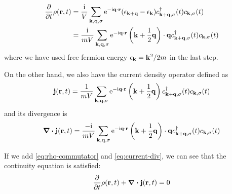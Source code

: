 \documentclass{article}
\newcommand{\ii}{\mathrm{i}}
\newcommand{\me}{\mathrm{e}}
\begin{document}
\begin{equation}\label{eq:rho-commutator}
    \begin{split}
        \pdv{t}\rho(\vb{r},t)&=\frac{\ii}{V}\sum_{\vb{k},\vb{q},\sigma}\me^{-\ii\vb{q}\cdot \vb{r}}(\epsilon_{\vb{k}+\vb{q}}-\epsilon_{\vb{k}})c_{\vb{k}+\vb{q},\sigma}^\dagger(t)c_{\vb{k},\sigma}(t)\\
                             &=\frac{\ii}{mV}\sum_{\vb{k},\vb{q},\sigma}\me^{-\ii\vb{q}\cdot \vb{r}}\left(\vb{k}+\frac{1}{2}\vb{q}\right)\cdot\vb{q}c_{\vb{k}+\vb{q},\sigma}^\dagger(t)c_{\vb{k},\sigma}(t)
    \end{split}
\end{equation}
where we have used free fermion energy $\epsilon_{\vb{k}}=\vb{k}^2/2m$ in the last step.

On the other hand, we also have the current density operator defined as
\begin{equation}
    \vb{j}(\vb{r},t)=\frac{1}{mV}\sum_{\vb{k},\vb{q},\sigma}\me^{-\ii\vb{q}\cdot \vb{r}}\left(\vb{k}+\frac{1}{2}\vb{q}\right)c_{\vb{k}+\vb{q},\sigma}^\dagger(t)c_{\vb{k},\sigma}(t)
\end{equation}
and its divergence is
\begin{equation}\label{eq:current-div}
    \div{\vb{j}(\vb{r},t)}=\frac{-\ii}{mV}\sum_{\vb{k},\vb{q},\sigma}\me^{-\ii\vb{q}\cdot \vb{r}}\left(\vb{k}+\frac{1}{2}\vb{q}\right)\cdot \vb{q}c_{\vb{k}+\vb{q},\sigma}^\dagger(t)c_{\vb{k},\sigma}(t)
\end{equation}

If we add \cref{eq:rho-commutator} and \cref{eq:current-div}, we can see that the continuity equation is satisfied:
\begin{equation}
    \pdv{t}\rho(\vb{r},t)+\div{\vb{j}(\vb{r},t)}=0
\end{equation}

%
%
\end{document}
